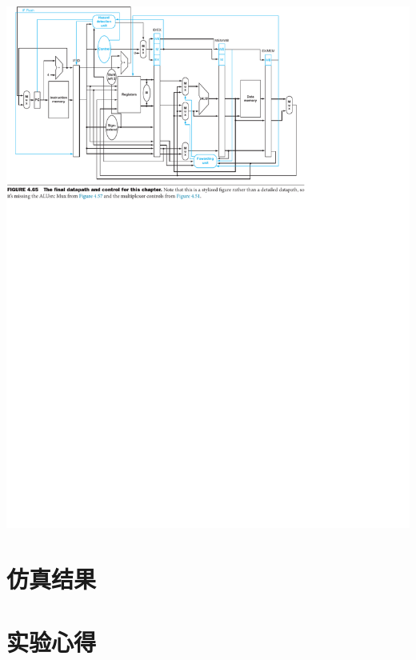\documentclass[a4paper,UTF8]{ctexart}
\begin{document}
\includegraphics[width=\textwidth]{FINAL.pdf}

\section{仿真结果}



\section{实验心得}
\end{document}
